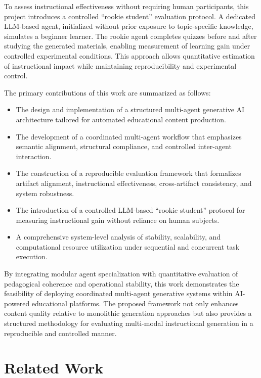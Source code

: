 \documentclass[10pt,journal,compsoc]{IEEEtran}
\begin{document}
To assess instructional effectiveness without requiring human participants, this project introduces a controlled “rookie student” evaluation protocol. A dedicated LLM-based agent, initialized without prior exposure to topic-specific knowledge, simulates a beginner learner. The rookie agent completes quizzes before and after studying the generated materials, enabling measurement of learning gain under controlled experimental conditions. This approach allows quantitative estimation of instructional impact while maintaining reproducibility and experimental control.

The primary contributions of this work are summarized as follows:

\begin{itemize}
    \item The design and implementation of a structured multi-agent generative AI architecture tailored for automated educational content production.
    \item The development of a coordinated multi-agent workflow that emphasizes semantic alignment, structural compliance, and controlled inter-agent interaction.
    \item The construction of a reproducible evaluation framework that formalizes artifact alignment, instructional effectiveness, cross-artifact consistency, and system robustness.
    \item The introduction of a controlled LLM-based “rookie student” protocol for measuring instructional gain without reliance on human subjects.
    \item A comprehensive system-level analysis of stability, scalability, and computational resource utilization under sequential and concurrent task execution.
\end{itemize}

By integrating modular agent specialization with quantitative evaluation of pedagogical coherence and operational stability, this work demonstrates the feasibility of deploying coordinated multi-agent generative systems within AI-powered educational platforms. The proposed framework not only enhances content quality relative to monolithic generation approaches but also provides a structured methodology for evaluating multi-modal instructional generation in a reproducible and controlled manner.




\section{Related Work}
\end{document}
